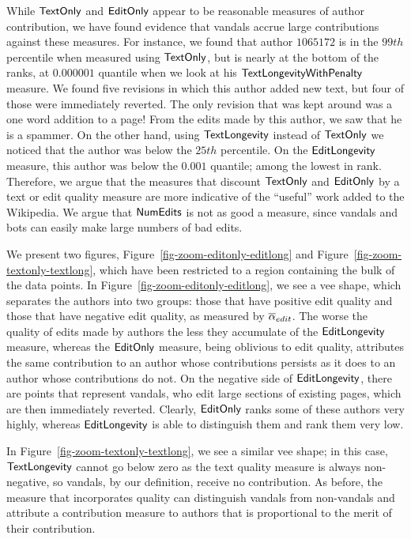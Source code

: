 While $\mathsf{TextOnly}$ and $\mathsf{EditOnly}$ appear to be reasonable measures 
of author contribution, we have found evidence that vandals
accrue large contributions against these measures.
For instance, we found that author $1065172$ is in the $99th$ 
percentile when measured using $\mathsf{TextOnly}$, but is nearly at the
bottom of the ranks, at $0.000001$ quantile when we look at his
$\mathsf{TextLongevityWithPenalty}$ measure.
We found five revisions in which this author added new text, but
four of those were immediately reverted.
The only revision that was kept around was a one word addition to a
page!
From the edits made by this author, we saw that he is a spammer.
On the other hand, using $\mathsf{TextLongevity}$ instead of $\mathsf{TextOnly}$ we
noticed that the author was below the $25th$ percentile.
On the $\mathsf{EditLongevity}$ measure, this author was below the 
$0.001$ quantile; among the lowest in rank.
Therefore, we argue that the measures that discount $\mathsf{TextOnly}$ and 
$\mathsf{EditOnly}$ by a text or edit quality measure are more indicative
of the ``useful'' work added to the Wikipedia.
We argue that $\mathsf{NumEdits}$ is not as good a measure, since 
vandals and bots can easily make large numbers of bad edits.

We present two figures, Figure~\ref{fig-zoom-editonly-editlong}
and Figure~\ref{fig-zoom-textonly-textlong},
which have been restricted to a region containing the
bulk of the data points.
In Figure~\ref{fig-zoom-editonly-editlong},
we see a vee shape, which separates the authors into
two groups: those that have positive edit quality and those
that have negative edit quality, as measured by ${\overline{\alpha}}_{edit}$.
The worse the quality of edits made by authors the less they
accumulate of the $\mathsf{EditLongevity}$ measure, whereas the $\mathsf{EditOnly}$
measure, being oblivious to edit quality, attributes the same
contribution to an author whose contributions persists as it 
does to an author whose contributions do not.
On the negative side of $\mathsf{EditLongevity}$, there are points that represent
vandals, who edit large sections of existing pages, which are
then immediately reverted.
Clearly, $\mathsf{EditOnly}$ ranks some of these authors very highly,
whereas $\mathsf{EditLongevity}$ is able to distinguish them and rank
them very low.

In Figure~\ref{fig-zoom-textonly-textlong},
we see a similar vee shape; in this case, $\mathsf{TextLongevity}$
cannot go below zero as the text quality measure is always 
non-negative, so vandals, by our definition, receive no 
contribution.
As before, the measure that incorporates quality can 
distinguish vandals from non-vandals and attribute a contribution
measure to authors that is proportional to the merit of their
contribution.

